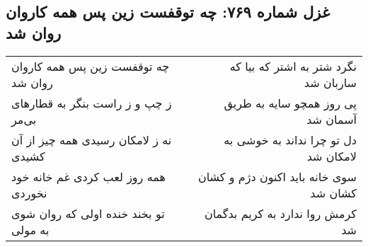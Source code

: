 \begin{center}
\section*{غزل شماره ۷۶۹: چه توقفست زین پس همه کاروان روان شد}
\label{sec:0769}
\begin{longtable}{l p{0.5cm} r}
چه توقفست زین پس همه کاروان روان شد
&&
نگرد شتر به اشتر که بیا که ساربان شد
\\
ز چپ و ز راست بنگر به قطارهای بی‌مر
&&
پی روز همچو سایه به طریق آسمان شد
\\
نه ز لامکان رسیدی همه چیز از آن کشیدی
&&
دل تو چرا نداند به خوشی به لامکان شد
\\
همه روز لعب کردی غم خانه خود نخوردی
&&
سوی خانه باید اکنون دژم و کشان کشان شد
\\
تو بخند خنده اولی که روان شوی به مولی
&&
کرمش روا ندارد به کریم بدگمان شد
\\
\end{longtable}
\end{center}
